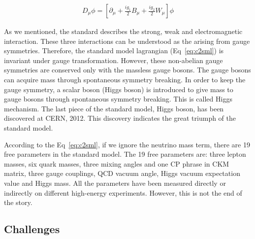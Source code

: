 \begin{equation}
 \begin{aligned}
  D_{\mu}\phi = [\partial_{\mu}+\frac{ig_{1}}{2}B_{\mu}+\frac{ig_{2}}{2}W_{\mu}]\phi
 \end{aligned}
 \label{eq:c2smldh}
\end{equation}

As we mentioned, the standard describes the strong, weak and electromagnetic interaction. These three interactions can be understood as the arising from gauge symmetries\cite{PhysRev.96.191}. Therefore, the standard model lagrangian (Eq~\ref{eq:c2sml}) is invariant under gauge transformation. However, these non-abelian gauge symmetries are conserved only with the massless gauge bosons. The gauge bosons can acquire mass through spontaneous symmetry breaking\cite{PhysRevLett.4.380,PhysRev.122.345,PhysRev.124.246}. In order to keep the gauge symmetry, a scalar boson (Higgs boson) is introduced to give mass to gauge bosons through spontaneous symmetry breaking. This is called Higgs mechanism\cite{PhysRevLett.13.321,PhysRevLett.13.508}. The last piece of the standard model, Higgs boson, has been discovered at CERN, 2012\cite{Aad:2012tfa,Chatrchyan:2012xdj}. This discovery indicates the great triumph of the standard model\cite{PhysRevLett.19.1264,PhysRevLett.30.1343,PhysRevLett.30.1346}.

According to the Eq~\ref{eq:c2sml}, if we ignore the neutrino mass term, there are 19 free parameters in the standard model. The 19 free parameters are: three lepton masses, six quark masses, three mixing angles and one CP phrase in CKM matrix\cite{PhysRevLett.10.531,Kobayashi:1973fv}, three gauge couplings, QCD vacuum angle, Higgs vacuum expectation value and Higgs mass. All the parameters have been measured directly or indirectly on different high-energy experiments. However, this is not the end of the story. 

\clearpage
\subsection{Challenges}

